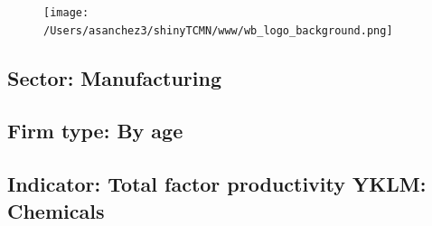 \documentclass{article}\usepackage[]{graphicx}\usepackage[]{color}
\begin{document}
%

\begin{figure}
  \vspace{-3ex} %
  \hspace{-7ex} %
  \texttt{[image: /Users/asanchez3/shinyTCMN/www/wb\_logo\_background.png]}
\end{figure}
 \begin{minipage}[t]{1.1\textwidth} %
      \vspace{-30ex}
      \hspace{10ex}
  \end{minipage}
  
%
\begin{minipage}[t]{0.99\textwidth} %
  \vspace{-0.5cm}
      \subsection*{\color{white!40!black}Sector: \color{blue!40!black}Manufacturing}
      \subsection*{\color{white!40!black}Firm type: \color{blue!40!black}By age}
      \subsection*{\color{white!40!black}Indicator: \color{blue!40!black}Total factor productivity YKLM: Chemicals}
  \end{minipage} %
\end{document}
